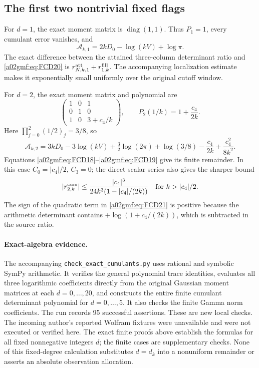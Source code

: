\documentclass[11pt,a4paper]{article}
\begin{document}
\subsection{The first two nontrivial fixed flags}

For \(d=1\), the exact moment matrix is \(\operatorname{diag}(1,1)\).
Thus \(P_1=1\), every cumulant error vanishes, and
\begin{equation}
 \mathcal A_{k,1}=2kD_0-\log(kV)+\log\pi .
 \tag{FCD20}\label{a02gmf:eq:FCD20}
\end{equation}
The exact difference between the attained three-column determinant
ratio and \eqref{a02gmf:eq:FCD20} is
\(r_{N,k,1}^{\rm att}+r_{1,k}^{\rm fill}\).
The accompanying localization estimate makes it exponentially small
uniformly over the original cutoff window.

For \(d=2\), the exact moment matrix and polynomial are
\[
 \begin{pmatrix}
 1&0&1\\
 0&1&0\\
 1&0&3+c_4/k
 \end{pmatrix},
 \qquad P_2(1/k)=1+\frac{c_4}{2k}.
\]
Here \(\prod_{j=0}^2(1/2)_j=3/8\), so
\begin{equation}
 \mathcal A_{k,2}
 =3kD_0-3\log(kV)+\tfrac32\log(2\pi)+\log(3/8)
                 -\frac{c_4}{2k}+\frac{c_4^2}{8k^2}.
 \tag{FCD21}\label{a02gmf:eq:FCD21}
\end{equation}
Equations \eqref{a02gmf:eq:FCD18}--\eqref{a02gmf:eq:FCD19} give its finite remainder.
In this case \(C_0=|c_4|/2\), \(C_3=0\); the direct scalar series also
gives the sharper bound
\[
 |r_{2,k}^{\rm cum}|
    \le\frac{|c_4|^3}{24k^3(1-|c_4|/(2k))}
       \quad\text{for }k>|c_4|/2 .
\]
The sign of the quadratic term in \eqref{a02gmf:eq:FCD21} is positive because
the arithmetic determinant contains \(+\log(1+c_4/(2k))\), which is
subtracted in the source ratio.

\paragraph{Exact-algebra evidence.}
The accompanying \texttt{check\_exact\_cumulants.py} uses rational and
symbolic SymPy arithmetic. It verifies the general polynomial trace
identities, evaluates all three logarithmic coefficients directly from
the original Gaussian moment matrices at each \(d=0,\ldots,20\), and
constructs the entire finite cumulant determinant polynomial for
\(d=0,\ldots,5\). It also checks the finite Gamma norm coefficients.
The run records 95 successful assertions. These are new local checks.
The incoming author's reported Wolfram fixtures were unavailable and
were not executed or verified here. The exact finite proofs above
establish the formulas for all fixed nonnegative integers \(d\);
the finite cases are supplementary checks. None of this fixed-degree
calculation substitutes \(d=d_k\) into a nonuniform remainder or
asserts an absolute observation allocation.
\end{document}
